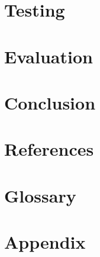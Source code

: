 \documentclass{article}
\begin{document}
\newpage


\newpage
\section{Testing}

\newpage
\section{Evaluation}

\newpage
\section{Conclusion}

\newpage
\section{References}

\renewcommand{\bibname}{}

\newpage
\section{Glossary}
\printglossary
\newpage
\section{Appendix}
\end{document}
